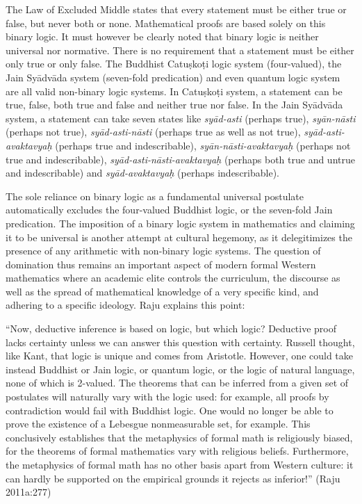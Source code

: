 The Law of Excluded Middle states that every statement must be either true or false, but never both or none. Mathematical proofs are based solely on this binary logic. It must however be clearly noted that binary logic is neither universal nor normative. There is no requirement that a statement must be either only true or only false. The Buddhist Catuṣkoṭi  logic system (four-valued), the Jain Syādvāda system (seven-fold predication) and even quantum logic system are all valid non-binary logic systems. In Catuṣkoṭi system, a statement can be true, false, both true and false and neither true nor false. In the Jain Syādvāda system, a statement can take seven states like {\sl syād-asti} (perhaps true), {\sl syān-nāsti} (perhaps not true), {\sl syād-asti-nāsti} (perhaps true as well as not true), {\sl syād-asti-avaktavyaḥ} (perhaps true and indescribable), {\sl syān-nāsti-avaktavyaḥ} (perhaps not true and indescribable), {\sl syād-asti-nāsti-avaktavyaḥ} (perhaps both true and untrue and indescribable) and {\sl syād-avaktavyaḥ} (perhaps indescribable). 

The sole reliance on binary logic as a fundamental universal postulate automatically excludes the four-valued Buddhist logic, or the seven-fold Jain predication. The imposition of a binary logic system in mathematics and claiming it to be universal is another attempt at cultural hegemony, as it delegitimizes the presence of any arithmetic with non-binary logic systems. The question of domination thus remains an important aspect of modern formal Western mathematics where an academic elite controls the curriculum, the discourse as well as the spread of mathematical knowledge of a very specific kind, and adhering to a specific ideology. Raju explains this point: 
\begin{myquote}
``Now, deductive inference is based on logic, but which logic? Deductive proof lacks certainty unless we can answer this question with certainty. Russell thought, like Kant, that logic is unique and comes from Aristotle. However, one could take instead Buddhist or Jain logic, or quantum logic, or the logic of natural language, none of which is 2-valued. The theorems that can be inferred from a given set of postulates will naturally vary with the logic used: for example, all proofs by contradiction would fail with Buddhist logic. One would no longer be able to prove the existence of a Lebesgue nonmeasurable set, for example. This conclusively establishes that the metaphysics of formal math is religiously biased, for the theorems of formal mathematics vary with religious beliefs. Furthermore, the metaphysics of formal math has no other basis apart from Western culture: it can hardly be supported on the empirical grounds it rejects as inferior!''
\hfill (Raju 2011a:277)
\end{myquote}


